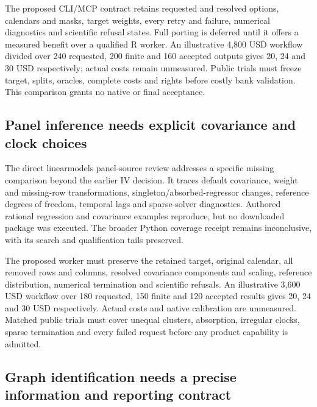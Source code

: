 The proposed CLI/MCP contract retains requested and resolved options,
calendars and masks, target weights, every retry and failure, numerical
diagnostics and scientific refusal states. Full porting is deferred
until it offers a measured benefit over a qualified R worker. An
illustrative 4,800 USD workflow divided over 240 requested, 200 finite
and 160 accepted outputs gives 20, 24 and 30 USD respectively; actual
costs remain unmeasured. Public trials must freeze target, splits,
oracles, complete costs and rights before costly bank validation. This
comparison grants no native or final acceptance.
\citep{exec24_fect_choice}

\hypertarget{panel-inference-needs-explicit-covariance-and-clock-choices}{%
\subsection{Panel inference needs explicit covariance and clock
choices}\label{panel-inference-needs-explicit-covariance-and-clock-choices}}

The direct linearmodels panel-source review addresses a specific missing
comparison beyond the earlier IV decision. It traces default covariance,
weight and missing-row transformations, singleton/absorbed-regressor
changes, reference degrees of freedom, temporal lags and sparse-solver
diagnostics. Authored rational regression and covariance examples
reproduce, but no downloaded package was executed. The broader Python
coverage receipt remains inconclusive, with its search and qualification
tails preserved. \citep{exec24_lmpanel_source,exec24_lmpanel_reference}

The proposed worker must preserve the retained target, original
calendar, all removed rows and columns, resolved covariance components
and scaling, reference distribution, numerical termination and
scientific refusals. An illustrative 3,600 USD workflow over 180
requested, 150 finite and 120 accepted results gives 20, 24 and 30 USD
respectively. Actual costs and native calibration are unmeasured.
Matched public trials must cover unequal clusters, absorption, irregular
clocks, sparse termination and every failed request before any product
capability is admitted. \citep{exec24_lmpanel_reference}

\hypertarget{graph-identification-needs-a-precise-information-and-reporting-contract}{%
\subsection{Graph identification needs a precise information and
reporting
contract}\label{graph-identification-needs-a-precise-information-and-reporting-contract}}

